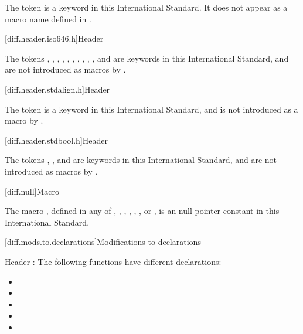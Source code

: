 \pnum
The token  is a keyword in this International
Standard. It does not appear as a macro name defined
in .

[diff.header.iso646.h]{Header }
%

\pnum
The tokens
,
,
,
,
,
,
,
,
,
,
and
are keywords in this International
Standard,
and are not introduced as macros
by .

[diff.header.stdalign.h]{Header }
%

\pnum
The token  is a keyword in this International
Standard,
and is not introduced as a macro
by .

[diff.header.stdbool.h]{Header }
%

\pnum
The tokens , , and 
are keywords in this International Standard,
and are not introduced as macros
by .

[diff.null]{Macro }

\pnum
The macro
,
defined in any of
,
,
,
,
,
,
or ,
is an  \Cpp{} null pointer constant in
this International Standard.

[diff.mods.to.declarations]{Modifications to declarations}

\pnum
Header :
The following functions have different declarations:

\begin{itemize}
\item {}
\item {}
\item {}
\item {}
\item {}
\end{itemize}

